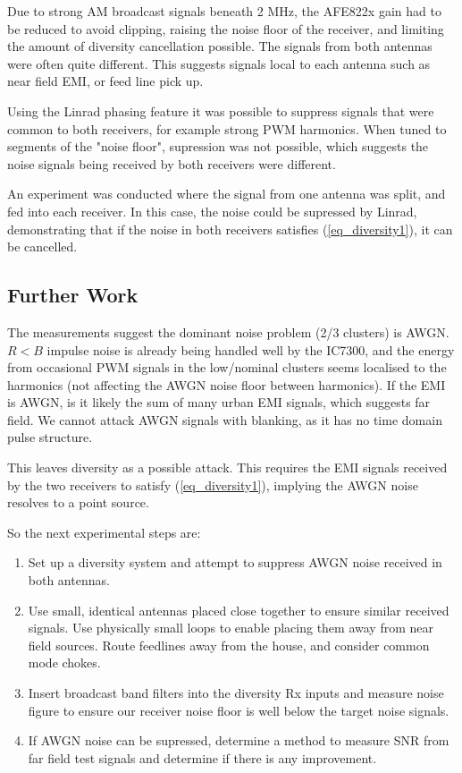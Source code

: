 \documentclass{article}
\begin{document}
Due to strong AM broadcast signals beneath 2 MHz, the AFE822x gain had to be reduced to avoid clipping, raising the noise floor of the receiver, and limiting the amount of diversity cancellation possible. The signals from both antennas were often quite different.  This suggests signals local to each antenna such as near field EMI, or feed line pick up.

Using the Linrad phasing feature \cite{linrad_phasing} it was possible to suppress signals that were common to both receivers, for example strong PWM harmonics.  When tuned to segments of the "noise floor", supression was not possible, which suggests the noise signals being received by both receivers were different.

An experiment was conducted where the signal from one antenna was split, and fed into each receiver.  In this case, the noise could be supressed by Linrad, demonstrating that if the noise in both receivers satisfies (\ref{eq_diversity1}), it can be cancelled.
  
\subsection{Further Work}

The measurements suggest the dominant noise problem (2/3 clusters) is AWGN. $R<B$ impulse noise is already being handled well by the IC7300, and the energy from occasional PWM signals in the low/nominal clusters seems localised to the harmonics (not affecting the AWGN noise floor between harmonics).  If the EMI is AWGN, is it likely the sum of many urban EMI signals, which suggests far field.  We cannot attack AWGN signals with blanking, as it has no time domain pulse structure.

This leaves diversity as a possible attack.  This requires the EMI signals received by the two receivers to satisfy (\ref{eq_diversity1}), implying the AWGN noise resolves to a point source.

So the next experimental steps are:
\begin{enumerate}
\item Set up a diversity system and attempt to suppress AWGN noise received in both antennas.
\item Use small, identical antennas placed close together to ensure similar received signals. Use physically small loops to enable placing them away from near field sources.  Route feedlines away from the house, and consider common mode chokes.
\item Insert broadcast band filters into the diversity Rx inputs and measure noise figure to ensure our receiver noise floor is well below the target noise signals.
\item If AWGN noise can be supressed, determine a method to measure SNR from far field test signals and determine if there is any improvement.
\end{enumerate}



\end{document}
